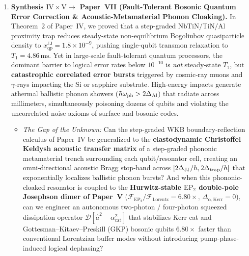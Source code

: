 \documentclass[11pt,letterpaper]{article}
\renewcommand{\hbar}{\mathchar'26\mkern-9mu h}
\begin{document}
\begin{enumerate}
    \item \textbf{Synthesis $\mathrm{IV} \times \mathrm{V} \longrightarrow$ Paper~VII (Fault-Tolerant Bosonic Quantum Error Correction \& Acoustic-Metamaterial Phonon Cloaking).}
    In Theorem~2 of Paper~IV, we proved that a step-graded $\mathrm{NbTiN/TiN/Al}$ proximity trap reduces steady-state non-equilibrium Bogoliubov quasiparticle density to $x_{\mathrm{qp}}^{\mathrm{JJ}} = 1.8\times 10^{-9}$, pushing single-qubit transmon relaxation to $T_1 = 4.86\,\mathrm{ms}$. Yet in large-scale fault-tolerant quantum processors, the dominant barrier to logical error rates below $10^{-10}$ is \textit{not} steady-state $T_1$, but \textbf{catastrophic correlated error bursts} triggered by cosmic-ray muons and $\gamma$-rays impacting the $\mathrm{Si}$ or sapphire substrate. High-energy impacts generate athermal ballistic phonon showers ($\hbar\omega_{\mathrm{ph}} > 2\Delta_{\mathrm{Al}}$) that radiate across millimeters, simultaneously poisoning dozens of qubits and violating the uncorrelated noise axioms of surface and bosonic codes.
    \begin{itemize}
        \item \textit{The Gap of the Unknown:} Can the step-graded WKB boundary-reflection calculus of Paper~IV be generalized to the \textbf{elastodynamic Christoffel--Keldysh acoustic transfer matrix} of a step-graded phononic metamaterial trench surrounding each qubit/resonator cell, creating an omni-directional acoustic Bragg stop-band across $[2\Delta_{\mathrm{JJ}}/\hbar, 2\Delta_{\mathrm{trap}}/\hbar]$ that exponentially localizes ballistic phonon bursts? And when this phononic-cloaked resonator is coupled to the \textbf{Hurwitz-stable $\mathrm{EP}_2$ double-pole Josephson dimer of Paper~V} ($\mathcal{F}_{\mathrm{EP}_2}/\mathcal{F}_{\mathrm{Lorentz}} = 6.80\times$, $\Delta_{\alpha,\mathrm{Kerr}} = 0$), can we engineer an autonomous two-photon / four-photon squeezed dissipation operator $\mathcal{D}[\hat{a}^2 - \alpha_{\mathrm{cat}}^2]$ that stabilizes Kerr-cat and Gottesman--Kitaev--Preskill (GKP) bosonic qubits $6.80\times$ faster than conventional Lorentzian buffer modes without introducing pump-phase-induced logical dephasing?
    \end{itemize}


\end{enumerate}
\end{document}
